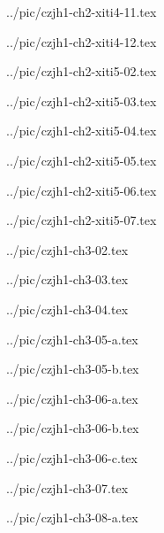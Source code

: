 ../pic/czjh1-ch2-xiti4-11.tex



../pic/czjh1-ch2-xiti4-12.tex



../pic/czjh1-ch2-xiti5-02.tex



../pic/czjh1-ch2-xiti5-03.tex



../pic/czjh1-ch2-xiti5-04.tex



../pic/czjh1-ch2-xiti5-05.tex



../pic/czjh1-ch2-xiti5-06.tex



../pic/czjh1-ch2-xiti5-07.tex



../pic/czjh1-ch3-02.tex



../pic/czjh1-ch3-03.tex



../pic/czjh1-ch3-04.tex



../pic/czjh1-ch3-05-a.tex



../pic/czjh1-ch3-05-b.tex



../pic/czjh1-ch3-06-a.tex



../pic/czjh1-ch3-06-b.tex



../pic/czjh1-ch3-06-c.tex



../pic/czjh1-ch3-07.tex



../pic/czjh1-ch3-08-a.tex



